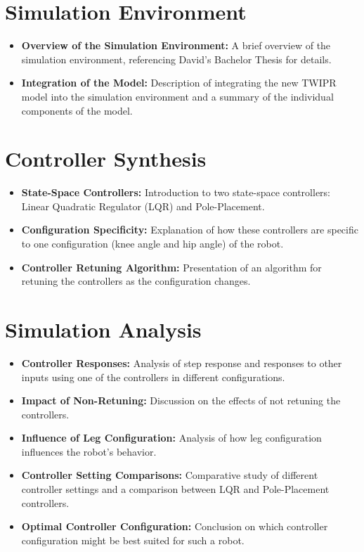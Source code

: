 \section{Simulation Environment}
\begin{itemize}
	\item \textbf{Overview of the Simulation Environment:} A brief overview of the simulation environment, referencing David's Bachelor Thesis for details.
	\item \textbf{Integration of the Model:} Description of integrating the new TWIPR model into the simulation environment and a summary of the individual components of the model.
\end{itemize}

\section{Controller Synthesis}
\begin{itemize}
	\item \textbf{State-Space Controllers:} Introduction to two state-space controllers: Linear Quadratic Regulator (LQR) and Pole-Placement.
	\item \textbf{Configuration Specificity:} Explanation of how these controllers are specific to one configuration (knee angle and hip angle) of the robot.
	\item \textbf{Controller Retuning Algorithm:} Presentation of an algorithm for retuning the controllers as the configuration changes.
\end{itemize}

\section{Simulation Analysis}
\begin{itemize}
	\item \textbf{Controller Responses:} Analysis of step response and responses to other inputs using one of the controllers in different configurations.
	\item \textbf{Impact of Non-Retuning:} Discussion on the effects of not retuning the controllers.
	\item \textbf{Influence of Leg Configuration:} Analysis of how leg configuration influences the robot's behavior.
	\item \textbf{Controller Setting Comparisons:} Comparative study of different controller settings and a comparison between LQR and Pole-Placement controllers.
	\item \textbf{Optimal Controller Configuration:} Conclusion on which controller configuration might be best suited for such a robot.
\end{itemize}









